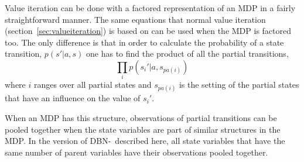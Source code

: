 Value iteration can be done with a factored representation of an MDP in a fairly straightforward manner. The same equations that normal value iteration (section~\ref{sec:valueiteration}) is based on can be used when the MDP is factored too. The only difference is that in order to calculate the probability of a state transition, $p(s'| a, s)$ one has to find the product of all the partial transitions,
$$\prod\limits _{i} p(s_i' | a, s_{pa(i)})$$
where $i$ ranges over all partial states and $s_{pa(i)}$ is the setting of the partial states that have an influence on the value of $s_i'$. 

When an MDP has this structure, observations of partial transitions can be pooled together when the state variables are part of similar structures in the MDP. In the version of DBN-\etre\ described here, all state variables that have the same number of parent variables have their observations pooled together. 

